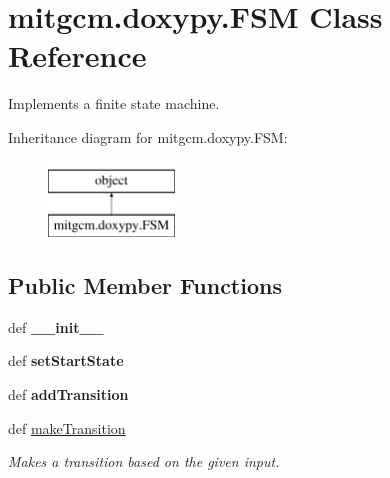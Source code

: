 \hypertarget{classmitgcm_1_1doxypy_1_1FSM}{\section{mitgcm.\+doxypy.\+F\+S\+M Class Reference}
\label{classmitgcm_1_1doxypy_1_1FSM}
}


Implements a finite state machine.  


Inheritance diagram for mitgcm.\+doxypy.\+F\+S\+M\+:\begin{figure}[H]
\begin{center}
\leavevmode
\includegraphics[height=2.000000cm]{classmitgcm_1_1doxypy_1_1FSM}
\end{center}
\end{figure}
\subsection*{Public Member Functions}
\begin{DoxyCompactItemize}
\item 
\hypertarget{classmitgcm_1_1doxypy_1_1FSM_a3677118f6f96e88433a8e51dbbf05659}{def {\bfseries \+\_\+\+\_\+init\+\_\+\+\_\+}}\label{classmitgcm_1_1doxypy_1_1FSM_a3677118f6f96e88433a8e51dbbf05659}

\item 
\hypertarget{classmitgcm_1_1doxypy_1_1FSM_a3bea16ec8ff7a3d29b8672c9c0f41668}{def {\bfseries set\+Start\+State}}\label{classmitgcm_1_1doxypy_1_1FSM_a3bea16ec8ff7a3d29b8672c9c0f41668}

\item 
\hypertarget{classmitgcm_1_1doxypy_1_1FSM_a0e78d906c03d1236510d6e5bdae41bde}{def {\bfseries add\+Transition}}\label{classmitgcm_1_1doxypy_1_1FSM_a0e78d906c03d1236510d6e5bdae41bde}

\item 
def \hyperlink{classmitgcm_1_1doxypy_1_1FSM_ace9d7c2a9520127f9dde1658062c1148}{make\+Transition}
\begin{DoxyCompactList}\small\item\em Makes a transition based on the given input. \end{DoxyCompactList}\end{DoxyCompactItemize}
